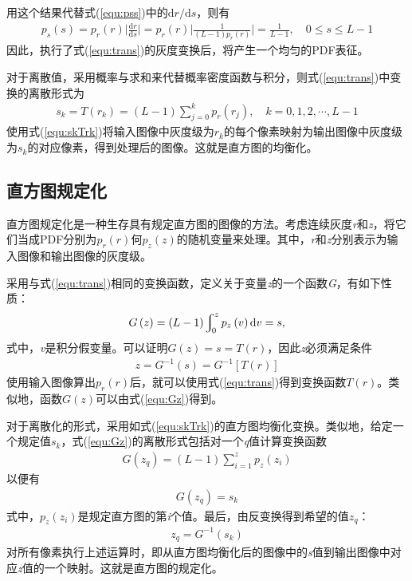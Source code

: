 \documentclass{hitreport}
\begin{document}
用这个结果代替式(\ref{equ:pss})中的$\left. \mathrm{d}r/\mathrm{d}s \right.$，则有
\begin{align}
p_s\left(s\right)=p_r\left(r\right)\Big|\frac{\mathrm{d}r}{\mathrm{d}s}\Big| = p_r\left(r\right)\Big|\frac{1}{\left(L-1\right)p_r\left(r\right)}\Big| = \frac{1}{L-1},\quad 0\le s\le L-1
\end{align}
因此，执行了式(\ref{equ:trans})的灰度变换后，将产生一个均匀的PDF表征。

对于离散值，采用概率与求和来代替概率密度函数与积分，则式(\ref{equ:trans})中变换的离散形式为
\begin{align}\label{equ:skTrk}
s_k = T\left(r_k\right) = \left(L-1\right) \sum_{j=0}^{k}p_r\left(r_j\right),\quad k=0,1,2,\cdots,L-1
\end{align}
使用式(\ref{equ:skTrk})将输入图像中灰度级为$r_k$的每个像素映射为输出图像中灰度级为$s_k$的对应像素，得到处理后的图像。这就是直方图的均衡化。

\subsection{直方图规定化}\label{sec:guidinghua}

直方图规定化是一种生存具有规定直方图的图像的方法。考虑连续灰度\textit{r}和\textit{z}，将它们当成PDF分别为$p_r\left(r\right)$何$p_z\left(z\right)$的随机变量来处理。其中，\textit{r}和\textit{z}分别表示为输入图像和输出图像的灰度级。

采用与式(\ref{equ:trans})相同的变换函数，定义关于变量\textit{z}的一个函数\textit{G}，有如下性质：
\begin{align}\label{equ:Gz}
G\left(z\right) = \left(L-1\right)\varint\nolimits_{0}^{z}p_z\left(v\right)\mathrm{d}v = s,
\end{align}
式中，\textit{v}是积分假变量。可以证明$G\left(z\right) = s = T\left(r\right)$，因此\textit{z}必须满足条件
\begin{align}
z = G^{-1}\left(s\right) = G^{-1}\left[T\left(r\right)\right]
\end{align}
使用输入图像算出$p_r\left(r\right)$后，就可以使用式(\ref{equ:trans})得到变换函数$T\left(r\right)$。类似地，函数$G\left(z\right)$可以由式(\ref{equ:Gz})得到。

对于离散化的形式，采用如式(\ref{equ:skTrk})的直方图均衡化变换。类似地，给定一个规定值$s_k$，式(\ref{equ:Gz})的离散形式包括对一个\textit{q}值计算变换函数
\begin{align}
G\left(z_q\right) = \left(L-1\right)\sum_{i=1}^{z}p_z\left(z_i\right)
\end{align}
以便有
\begin{align}
G\left(z_q\right) = s_k
\end{align}
式中，$p_z\left(z_i\right)$是规定直方图的第\textit{i}个值。最后，由反变换得到希望的值$z_q$：
\begin{align}
z_q = G^{-1}\left(s_k\right)
\end{align}
对所有像素执行上述运算时，即从直方图均衡化后的图像中的\textit{s}值到输出图像中对应\textit{z}值的一个映射。这就是直方图的规定化。
\end{document}
